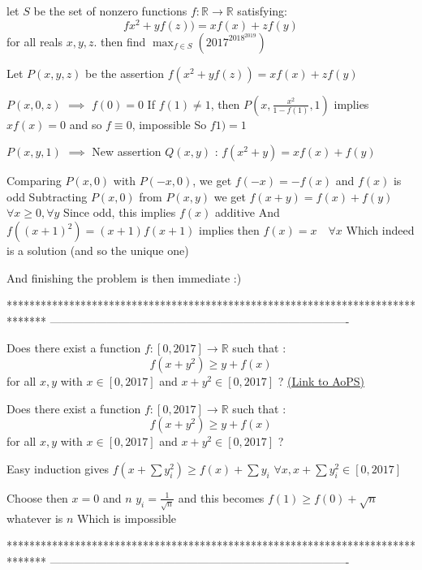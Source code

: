 \begin{solution}
	\begin{tcolorbox}let $S$ be the set of nonzero  functions $f : \mathbb{R} \rightarrow \mathbb{R}$ satisfying:
$$fx^2+yf(z))=xf(x)+zf(y)$$ for all reals $x,y,z$.
  then  find $\max_{f \in S} (2017^{2018^{2019 }})$\end{tcolorbox}
Let $P(x,y,z)$ be the assertion $f(x^2+yf(z))=xf(x)+zf(y)$

$P(x,0,z)$ $\implies$ $f(0)=0$
If $f(1)\ne 1$, then $P(x,\frac{x^2}{1-f(1)},1)$ implies $xf(x)=0$ and so $f\equiv 0$, impossible
So $f1)=1$

$P(x,y,1)$ $\implies$ New assertion $Q(x,y)$ : $f(x^2+y)=xf(x)+f(y)$

Comparing $P(x,0)$ with $P(-x,0)$, we get $f(-x)=-f(x)$ and $f(x)$ is odd
Subtracting $P(x,0)$ from $P(x,y)$ we get $f(x+y)=f(x)+f(y)$ $\forall x\ge 0,\forall y$
Since odd, this implies $f(x)$ additive
And $f((x+1)^2)=(x+1)f(x+1)$ implies then $\boxed{f(x)=x\quad\forall x}$
Which indeed is a solution (and so the unique one)

And finishing the problem is then immediate :)





\end{solution}
*******************************************************************************
-------------------------------------------------------------------------------

\begin{problem}
	Does there exist a function $f:[0,2017] \rightarrow \mathbb{R}$ such that :
$$f(x+y^2) \geq y+f(x)$$
for all $x,y$ with $x \in [0,2017]$ and $x+y^2 \in [0,2017]$ ?
	\flushright \href{https://artofproblemsolving.com/community/c6h1618755}{(Link to AoPS)}
\end{problem}



\begin{solution}
	\begin{tcolorbox}Does there exist a function $f:[0,2017] \rightarrow \mathbb{R}$ such that :
$$f(x+y^2) \geq y+f(x)$$
for all $x,y$ with $x \in [0,2017]$ and $x+y^2 \in [0,2017]$ ?\end{tcolorbox}
Easy induction gives $f(x+\sum y_i^2)\ge f(x)+\sum y_i$ $\forall x,x+\sum y_i^2\in[0,2017]$

Choose then $x=0$ and $n$ $y_i=\frac 1{\sqrt n}$ and this becomes $f(1)\ge f(0)+\sqrt n$ whatever is $n$
Which is impossible


\end{solution}
*******************************************************************************
-------------------------------------------------------------------------------

